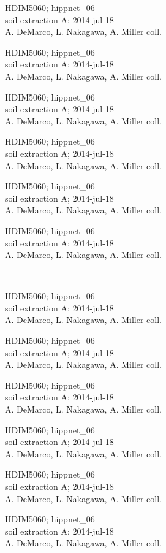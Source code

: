 \documentclass[2pt]{extarticle}
\begin{document}
\noindent
\parbox{0.16\textwidth}{\tiny \raggedright \rule[-0.3\baselineskip]{0pt}{10pt}HDIM5060; hippnet\_06\\ soil extraction A; 2014-jul-18\\ A. DeMarco, L. Nakagawa, A. Miller coll.}
\parbox{0.16\textwidth}{\tiny \raggedright \rule[-0.3\baselineskip]{0pt}{10pt}HDIM5060; hippnet\_06\\ soil extraction A; 2014-jul-18\\ A. DeMarco, L. Nakagawa, A. Miller coll.}
\parbox{0.16\textwidth}{\tiny \raggedright \rule[-0.3\baselineskip]{0pt}{10pt}HDIM5060; hippnet\_06\\ soil extraction A; 2014-jul-18\\ A. DeMarco, L. Nakagawa, A. Miller coll.}
\parbox{0.16\textwidth}{\tiny \raggedright \rule[-0.3\baselineskip]{0pt}{10pt}HDIM5060; hippnet\_06\\ soil extraction A; 2014-jul-18\\ A. DeMarco, L. Nakagawa, A. Miller coll.}
\parbox{0.16\textwidth}{\tiny \raggedright \rule[-0.3\baselineskip]{0pt}{10pt}HDIM5060; hippnet\_06\\ soil extraction A; 2014-jul-18\\ A. DeMarco, L. Nakagawa, A. Miller coll.}
\parbox{0.16\textwidth}{\tiny \raggedright \rule[-0.3\baselineskip]{0pt}{10pt}HDIM5060; hippnet\_06\\ soil extraction A; 2014-jul-18\\ A. DeMarco, L. Nakagawa, A. Miller coll.} \\ 
\vspace{0.001in} 

\noindent
\parbox{0.16\textwidth}{\tiny \raggedright \rule[-0.3\baselineskip]{0pt}{10pt}HDIM5060; hippnet\_06\\ soil extraction A; 2014-jul-18\\ A. DeMarco, L. Nakagawa, A. Miller coll.}
\parbox{0.16\textwidth}{\tiny \raggedright \rule[-0.3\baselineskip]{0pt}{10pt}HDIM5060; hippnet\_06\\ soil extraction A; 2014-jul-18\\ A. DeMarco, L. Nakagawa, A. Miller coll.}
\parbox{0.16\textwidth}{\tiny \raggedright \rule[-0.3\baselineskip]{0pt}{10pt}HDIM5060; hippnet\_06\\ soil extraction A; 2014-jul-18\\ A. DeMarco, L. Nakagawa, A. Miller coll.}
\parbox{0.16\textwidth}{\tiny \raggedright \rule[-0.3\baselineskip]{0pt}{10pt}HDIM5060; hippnet\_06\\ soil extraction A; 2014-jul-18\\ A. DeMarco, L. Nakagawa, A. Miller coll.}
\parbox{0.16\textwidth}{\tiny \raggedright \rule[-0.3\baselineskip]{0pt}{10pt}HDIM5060; hippnet\_06\\ soil extraction A; 2014-jul-18\\ A. DeMarco, L. Nakagawa, A. Miller coll.}
\parbox{0.16\textwidth}{\tiny \raggedright \rule[-0.3\baselineskip]{0pt}{10pt}HDIM5060; hippnet\_06\\ soil extraction A; 2014-jul-18\\ A. DeMarco, L. Nakagawa, A. Miller coll.} \\ 
\vspace{0.001in} 
\end{document}
